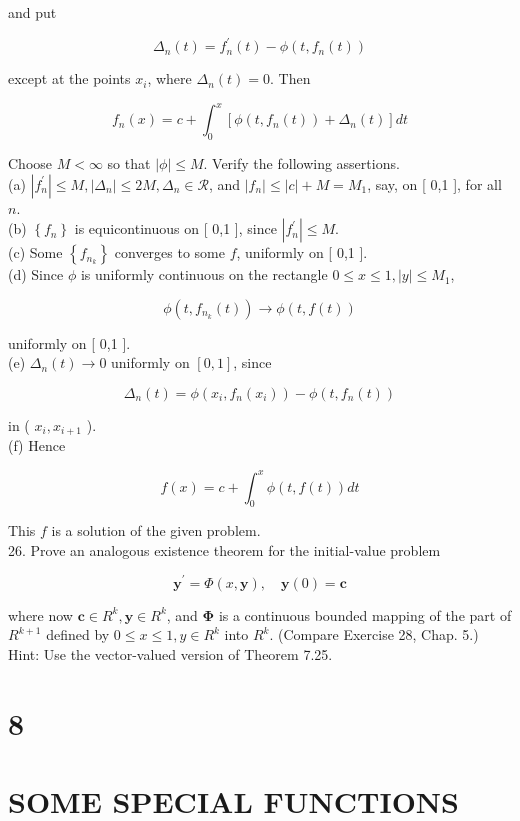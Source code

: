 \documentclass[10pt]{article}
\begin{document}
and put

$$
\Delta_{n}(t)=f_{n}^{\prime}(t)-\phi\left(t, f_{n}(t)\right)
$$

except at the points $x_{i}$, where $\Delta_{n}(t)=0$. Then

$$
f_{n}(x)=c+\int_{0}^{x}\left[\phi\left(t, f_{n}(t)\right)+\Delta_{n}(t)\right] d t
$$

Choose $M<\infty$ so that $|\phi| \leq M$. Verify the following assertions.\\
(a) $\left|f_{n}^{\prime}\right| \leq M,\left|\Delta_{n}\right| \leq 2 M, \Delta_{n} \in \mathscr{R}$, and $\left|f_{n}\right| \leq|c|+M=M_{1}$, say, on [ 0,1 ], for all $n$.\\
(b) $\left\{f_{n}\right\}$ is equicontinuous on [ 0,1 ], since $\left|f_{n}^{\prime}\right| \leq M$.\\
(c) Some $\left\{f_{n_{k}}\right\}$ converges to some $f$, uniformly on [ 0,1 ].\\
(d) Since $\phi$ is uniformly continuous on the rectangle $0 \leq x \leq 1,|y| \leq M_{1}$,

$$
\phi\left(t, f_{n_{k}}(t)\right) \rightarrow \phi(t, f(t))
$$

uniformly on [ 0,1 ].\\
(e) $\Delta_{n}(t) \rightarrow 0$ uniformly on $[0,1]$, since

$$
\Delta_{n}(t)=\phi\left(x_{i}, f_{n}\left(x_{i}\right)\right)-\phi\left(t, f_{n}(t)\right)
$$

in ( $x_{i}, x_{i+1}$ ).\\
(f) Hence

$$
f(x)=c+\int_{0}^{x} \phi(t, f(t)) d t
$$

This $f$ is a solution of the given problem.\\
26. Prove an analogous existence theorem for the initial-value problem

$$
\mathbf{y}^{\prime}=\Phi(x, \mathbf{y}), \quad \mathbf{y}(0)=\mathbf{c}
$$

where now $\mathbf{c} \in R^{k}, \mathbf{y} \in R^{k}$, and $\boldsymbol{\Phi}$ is a continuous bounded mapping of the part of $R^{k+1}$ defined by $0 \leq x \leq 1, y \in R^{k}$ into $R^{k}$. (Compare Exercise 28, Chap. 5.) Hint: Use the vector-valued version of Theorem 7.25.

\section*{8}
\section*{SOME SPECIAL FUNCTIONS}
\end{document}

